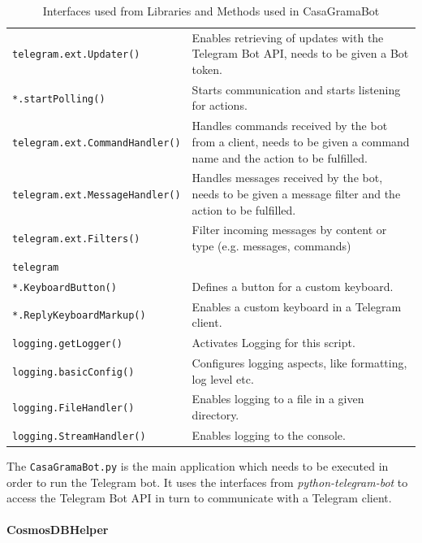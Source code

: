 \documentclass[a4paper]{article}
\begin{document}
\begin{table} [h!]
\begin{tabular} [h!] { | p{5.5cm} | p{9cm} | }
						\texttt{telegram.ext.Updater()} & Enables retrieving of updates with the Telegram Bot API, needs to be given a Bot token. \\
						\qquad\texttt{*.startPolling()} & Starts communication and starts listening for actions. \\ 
						\hline
						\texttt{telegram.ext.CommandHandler()} & Handles commands received by the bot from a client, needs to be given a command name and the action to be fulfilled. \\
						\texttt{telegram.ext.MessageHandler()} & Handles messages received by the bot, needs to be given a message filter and the action to be fulfilled. \\
						\texttt{telegram.ext.Filters()} & Filter incoming messages by content or type (e.g. messages, commands) \\ 
						\hline
						\texttt{telegram} & \\
						\qquad\texttt{*.KeyboardButton()} & Defines a button for a custom keyboard.  \\
						\qquad\texttt{*.ReplyKeyboardMarkup()} & Enables a custom keyboard in a Telegram client. \\ 
						\hline
						\texttt{logging.getLogger()} & Activates Logging for this script. \\
						\texttt{logging.basicConfig()} & Configures logging aspects, like formatting, log level etc. \\
						\texttt{logging.FileHandler()} & Enables logging to a file in a given directory. \\
						\texttt{logging.StreamHandler()} & Enables logging to the console. \\	
						\hline				
					\end{tabular}
					\caption{Interfaces used from Libraries and Methods used in CasaGramaBot}
					\label{tab:bot_int}
				\end{table}
		
				The \texttt{CasaGramaBot.py} is the main application which needs to be executed in order to run the Telegram bot. 
				It uses the interfaces from \textit{python-telegram-bot} to access the Telegram Bot API in turn to communicate with a Telegram client.
		
				\newpage
		
				\paragraph{CosmosDBHelper}
			
\end{document}
